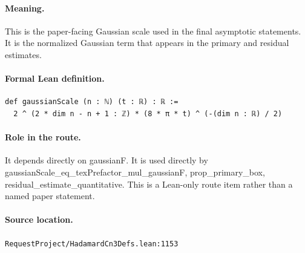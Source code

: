 \medskip
\paragraph{Meaning.}
This is the paper-facing Gaussian scale used in the final asymptotic statements. It is the normalized Gaussian term that appears in the primary and residual estimates.
\paragraph{Formal Lean definition.}
\begin{verbatim}
def gaussianScale (n : ℕ) (t : ℝ) : ℝ :=
  2 ^ (2 * dim n - n + 1 : ℤ) * (8 * π * t) ^ (-(dim n : ℝ) / 2)
\end{verbatim}
\paragraph{Role in the route.}
It depends directly on gaussianF. It is used directly by gaussianScale\_eq\_texPrefactor\_mul\_gaussianF, prop\_primary\_box, residual\_estimate\_quantitative. This is a Lean-only route item rather than a named paper statement.
\paragraph{Source location.}
\texttt{RequestProject/HadamardCn3Defs.lean:1153}
\medskip

